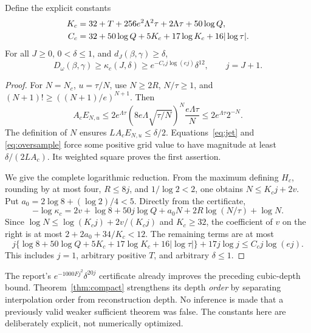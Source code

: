 \begin{theorem}
\label{thm:compact}
Define the explicit constants
\begin{align}
 K_c&=32+T+256e^2\Lambda^2\tau+2\Lambda\tau+50\log Q,\notag\\
 C_c&=32+50\log Q+5K_c+17\log K_c+16|\log\tau|.
 \label{eq:compact-constants}
\end{align}
For all $J\ge0$, $0<\delta\le1$, and $d_J(\beta,\gamma)\ge\delta$,
\begin{equation}
 D_\omega(\beta,\gamma)\ge\kappa_c(J,\delta)
 \ge e^{-C_cj\log(ej)}\delta^{12},\qquad j=J+1.
 \label{eq:compact-separation}
\end{equation}
\end{theorem}
\begin{proof}
For $N=N_c$, $u=\tau/N$, use $N\ge2R$, $N/\tau\ge1$, and
$(N+1)!\ge((N+1)/e)^{N+1}$. Then
\[
 A_c E_{N,u}\le
 2e^{\Lambda\tau}
 \left(8e\Lambda\sqrt{\tau/N}\right)^N\frac{e\Lambda\tau}{N}
 \le 2e^{\Lambda\tau}2^{-N}.
\]
The definition of $N$ ensures $LA_cE_{N,u}\le\delta/2$.
Equations~\eqref{eq:jet} and \eqref{eq:oversample} force some positive grid
value to have magnitude at least $\delta/(2LA_c)$. Its weighted square proves
the first assertion.

We give the complete logarithmic reduction. From the maximum defining $H_c$,
rounding by at most four, $R\le8j$, and $1/\log2<2$, one obtains
$N\le K_cj+2v$. Put $a_0=2\log8+(\log2)/4<5$. Directly from the certificate,
\[
 -\log\kappa_c=2v+\log8+50j\log Q+a_0N+2R\log(N/\tau)+\log N.
\]
Since $\log N\le\log(K_cj)+2v/(K_cj)$ and $K_c\ge32$, the coefficient
of $v$ on the right is at most
$2+2a_0+34/K_c<12$. The remaining terms are at most
\[
 j\{\log8+50\log Q+5K_c+17\log K_c+16|\log\tau|\}
       +17j\log j\le C_cj\log(ej).
\]
This includes $j=1$, arbitrary positive $T$, and arbitrary $\delta\le1$.
\end{proof}

\begin{remark}
The report's $e^{-1000Fj^2}\delta^{20j}$ certificate already improves the
preceding cubic-depth bound. Theorem~\ref{thm:compact} strengthens its depth
\emph{order} by separating interpolation order from reconstruction depth.
No inference is made that a previously valid weaker sufficient theorem was
false. The constants here are deliberately explicit, not numerically optimized.
\end{remark}

